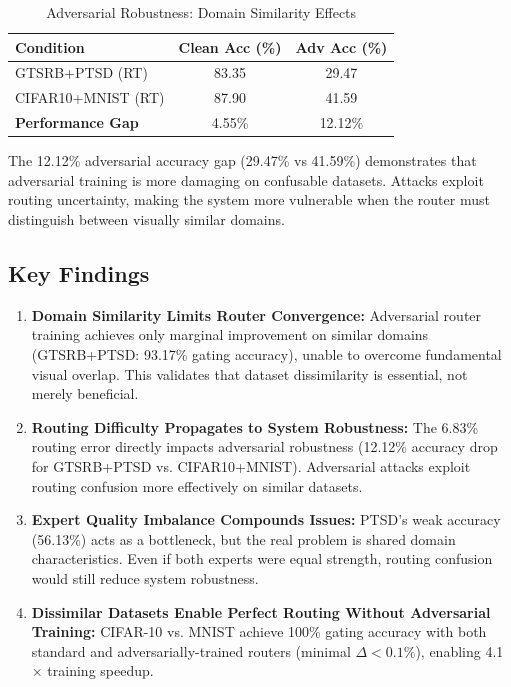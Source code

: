 \documentclass[11pt,a4paper]{article}
\begin{document}
\begin{table}[H]
\centering
\small
\begin{tabular}{lcc}
\toprule
\textbf{Condition} & \textbf{Clean Acc (\%)} & \textbf{Adv Acc (\%)} \\
\midrule
GTSRB+PTSD (RT) & 83.35 & 29.47 \\
CIFAR10+MNIST (RT) & 87.90 & 41.59 \\
\midrule
\textbf{Performance Gap} & 4.55\% & 12.12\% \\
\bottomrule
\end{tabular}
\caption{Adversarial Robustness: Domain Similarity Effects}
\end{table}

The 12.12\% adversarial accuracy gap (29.47\% vs 41.59\%) demonstrates that adversarial training is more damaging on confusable datasets. Attacks exploit routing uncertainty, making the system more vulnerable when the router must distinguish between visually similar domains.

\subsection{Key Findings}

\begin{enumerate}
    \item \textbf{Domain Similarity Limits Router Convergence:} Adversarial router training achieves only marginal improvement on similar domains (GTSRB+PTSD: 93.17\% gating accuracy), unable to overcome fundamental visual overlap. This validates that dataset dissimilarity is essential, not merely beneficial.

    \item \textbf{Routing Difficulty Propagates to System Robustness:} The 6.83\% routing error directly impacts adversarial robustness (12.12\% accuracy drop for GTSRB+PTSD vs. CIFAR10+MNIST). Adversarial attacks exploit routing confusion more effectively on similar datasets.

    \item \textbf{Expert Quality Imbalance Compounds Issues:} PTSD's weak accuracy (56.13\%) acts as a bottleneck, but the real problem is shared domain characteristics. Even if both experts were equal strength, routing confusion would still reduce system robustness.

    \item \textbf{Dissimilar Datasets Enable Perfect Routing Without Adversarial Training:} CIFAR-10 vs. MNIST achieve 100\% gating accuracy with both standard and adversarially-trained routers (minimal $\Delta < 0.1\%$), enabling 4.1$\times$ training speedup.
\end{enumerate}
\end{document}
